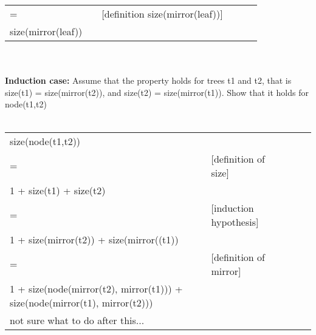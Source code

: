 \documentclass{article}
\begin{document}
\begin{enumerate}[\bf I.]
\begin{enumerate}
\begin{tabular}{l ll lll}
     = &   & [definition size(mirror(leaf))] \\
     size(mirror(leaf)) & &  \\
\end{tabular} \\
\\
\textbf{Induction case:} Assume that the property holds for trees t1 and t2, that is size(t1) = size(mirror(t2)), and size(t2) = size(mirror(t1)). Show that it holds for node(t1,t2) \\
\\
\begin{tabular}{l ll lll}
     size(node(t1,t2)) &    &  \\
     = &   & [definition of size] \\
     1 + size(t1) + size(t2) & & \\
     = &   & [induction hypothesis] \\
     1 + size(mirror(t2)) + size(mirror((t1)) & & \\
     = & & [definition of mirror] \\
     1 + size(node(mirror(t2), mirror(t1))) + size(node(mirror(t1), mirror(t2))) & & \\
     not sure what to do after this... \\
\end{tabular} \\
\\


\end{enumerate}
\end{enumerate}
\end{document}
